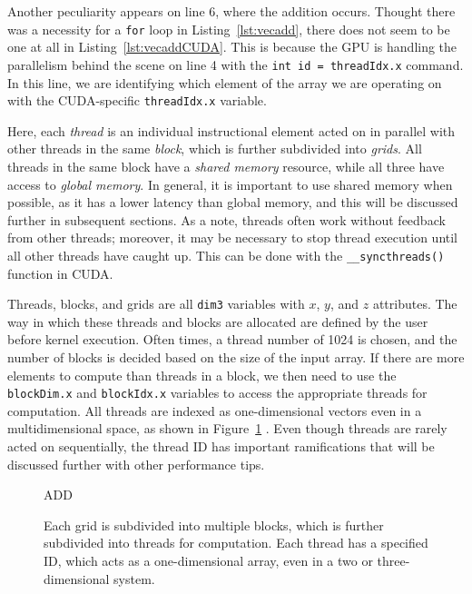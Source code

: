 Another peculiarity appears on line 6, where the addition occurs.
Thought there was a necessity for a \texttt{for} loop in Listing~\ref{lst:vecadd}, there does not seem to be one at all in Listing~\ref{lst:vecaddCUDA}.
This is because the GPU is handling the parallelism behind the scene on line 4 with the \texttt{int id = threadIdx.x} command.
In this line, we are identifying which element of the array we are operating on with the CUDA-specific \texttt{threadIdx.x} variable.

Here, each \textit{thread} is an individual instructional element acted on in parallel with other threads in the same \textit{block}, which is further subdivided into \textit{grids}.
All threads in the same block have a \textit{shared memory} resource, while all three have access to \textit{global memory}.
In general, it is important to use shared memory when possible, as it has a lower latency than global memory, and this will be discussed further in subsequent sections.
As a note, threads often work without feedback from other threads; moreover, it may be necessary to stop thread execution until all other threads have caught up.
This can be done with the \texttt{\_\_syncthreads()} function in CUDA.

Threads, blocks, and grids are all \texttt{dim3} variables with $x$, $y$, and $z$ attributes.
The way in which these threads and blocks are allocated are defined by the user before kernel execution.
Often times, a thread number of 1024 is chosen, and the number of blocks is decided based on the size of the input array.
If there are more elements to compute than threads in a block, we then need to use the \texttt{blockDim.x} and \texttt{blockIdx.x} variables to access the appropriate threads for computation.
All threads are indexed as one-dimensional vectors even in a multidimensional space, as shown in Figure~\ref{fig:threadsnblocks} .
Even though threads are rarely acted on sequentially, the thread ID has important ramifications that will be discussed further with other performance tips.

\begin{figure}
ADD
\label{fig:threadsnblocks}
\caption{Each grid is subdivided into multiple blocks, which is further subdivided into threads for computation. Each thread has a specified ID, which acts as a one-dimensional array, even in a two or three-dimensional system.}
\end{figure}

